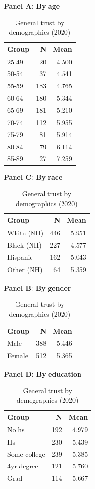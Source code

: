\begin{table}[htbp]\centering\small
\caption{General trust by demographics (2020)}
\label{tab:trust_general_demographics_panels}
\begin{minipage}[t]{0.48\textwidth}\centering
\textbf{Panel A: By age}\\[0.3em]
\begin{tabular}{lrr}\toprule
Group & N & Mean \\ \midrule
25-49 & 20 & 4.500 \\
50-54 & 37 & 4.541 \\
55-59 & 183 & 4.765 \\
60-64 & 180 & 5.344 \\
65-69 & 181 & 5.210 \\
70-74 & 112 & 5.955 \\
75-79 & 81 & 5.914 \\
80-84 & 79 & 6.114 \\
85-89 & 27 & 7.259 \\
\bottomrule
\end{tabular}
\end{minipage}\hfill
\begin{minipage}[t]{0.48\textwidth}\centering
\textbf{Panel C: By race}\\[0.3em]
\begin{tabular}{lrr}\toprule
Group & N & Mean \\ \midrule
White (NH) & 446 & 5.951 \\
Black (NH) & 227 & 4.577 \\
Hispanic & 162 & 5.043 \\
Other (NH) & 64 & 5.359 \\
\bottomrule
\end{tabular}
\end{minipage}
\par\vspace{0.8em}
\begin{minipage}[t]{0.48\textwidth}\centering
\textbf{Panel B: By gender}\\[0.3em]
\begin{tabular}{lrr}\toprule
Group & N & Mean \\ \midrule
Male & 388 & 5.446 \\
Female & 512 & 5.365 \\
\bottomrule
\end{tabular}
\end{minipage}\hfill
\begin{minipage}[t]{0.48\textwidth}\centering
\textbf{Panel D: By education}\\[0.3em]
\begin{tabular}{lrr}\toprule
Group & N & Mean \\ \midrule
No hs & 192 & 4.979 \\
Hs & 230 & 5.439 \\
Some college & 239 & 5.385 \\
4yr degree & 121 & 5.760 \\
Grad & 114 & 5.667 \\
\bottomrule
\end{tabular}
\end{minipage}
\end{table}
